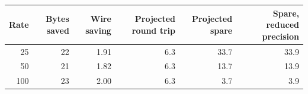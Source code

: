 \begin{tabular}{@{}rrrrrr@{}}
\toprule
Rate & Bytes saved & Wire saving & Projected round trip & Projected spare & Spare, reduced precision \\
\midrule
25 & 22 & 1.91 & 6.3 & 33.7 & 33.9 \\
50 & 21 & 1.82 & 6.3 & 13.7 & 13.9 \\
100 & 23 & 2.00 & 6.3 & 3.7 & 3.9 \\
\bottomrule
\end{tabular}
